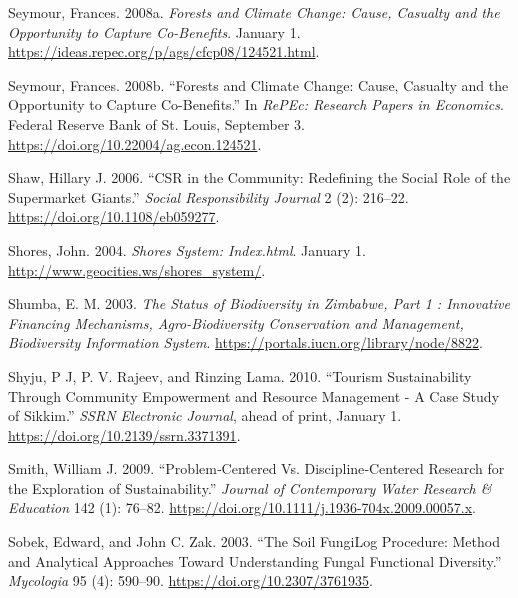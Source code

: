 \begin{CSLReferences}{1}{1}
Seymour, Frances. 2008a. \emph{Forests and Climate Change: Cause,
Casualty and the Opportunity to Capture Co-Benefits}. January 1.
\url{https://ideas.repec.org/p/ags/cfcp08/124521.html}.

Seymour, Frances. 2008b. {``Forests and Climate Change: Cause, Casualty
and the Opportunity to Capture Co-Benefits.''} In \emph{RePEc: Research
Papers in Economics}. Federal Reserve Bank of St. Louis, September 3.
\url{https://doi.org/10.22004/ag.econ.124521}.

Shaw, Hillary J. 2006. {``CSR in the Community: Redefining the Social
Role of the Supermarket Giants.''} \emph{Social Responsibility Journal}
2 (2): 216--22. \url{https://doi.org/10.1108/eb059277}.

Shores, John. 2004. \emph{Shores System: Index.html}. January 1.
\url{http://www.geocities.ws/shores_system/}.

Shumba, E. M. 2003. \emph{The Status of Biodiversity in Zimbabwe, Part 1
: Innovative Financing Mechanisms, Agro-Biodiversity Conservation and
Management, Biodiversity Information System}.
\url{https://portals.iucn.org/library/node/8822}.

Shyju, P J, P. V. Rajeev, and Rinzing Lama. 2010. {``Tourism
Sustainability Through Community Empowerment and Resource Management - A
Case Study of Sikkim.''} \emph{SSRN Electronic Journal}, ahead of print,
January 1. \url{https://doi.org/10.2139/ssrn.3371391}.

Smith, William J. 2009. {``Problem‐Centered Vs. Discipline‐Centered
Research for the Exploration of Sustainability.''} \emph{Journal of
Contemporary Water Research \& Education} 142 (1): 76--82.
\url{https://doi.org/10.1111/j.1936-704x.2009.00057.x}.

Sobek, Edward, and John C. Zak. 2003. {``The Soil FungiLog Procedure:
Method and Analytical Approaches Toward Understanding Fungal Functional
Diversity.''} \emph{Mycologia} 95 (4): 590--90.
\url{https://doi.org/10.2307/3761935}.


\end{CSLReferences}
